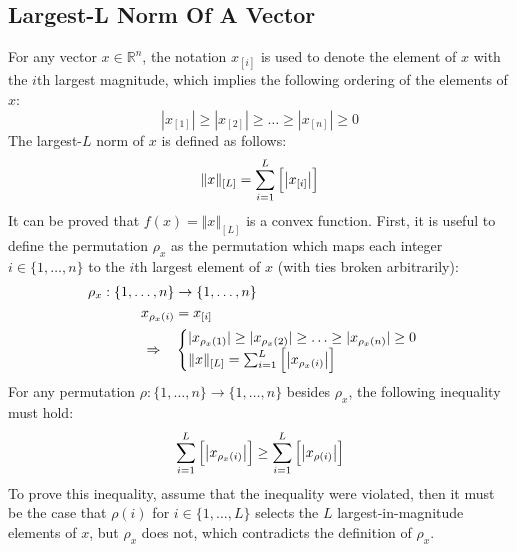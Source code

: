 \subsection{Largest-L Norm Of A Vector}
For any vector $x\in\mathbb{R}^n$, the notation $x_{[i]}$ is used to denote the element of $x$ with the $i$th largest magnitude, which implies the following ordering of the elements of $x$:
\begin{equation*}
    |x_{[1]}| \ge |x_{[2]}| \ge \hdots \ge |x_{[n]}| \ge 0
\end{equation*}
The largest-$L$ norm of $x$ is defined as follows:
\begin{equation}
    \Vert x \Vert_{[L]} = \sum_{i=1}^L{\Bigl[ \left\vert x_{[i]} \right\vert \Bigr]}
\end{equation}
It can be proved that $f(x) = \Vert x \Vert_{[L]}$ is a convex function. First, it is useful to define the permutation $\rho_x$ as the permutation which maps each integer $i\in\{1,\hdots,n\}$ to the $i$th largest element of $x$ (with ties broken arbitrarily):
\begin{align*}
    \rho_x: \{1,\hdots,n\} &\rightarrow \{1,\hdots,n\} \\
    x_{\rho_x(i)} &= x_{[i]} \\
    \Rightarrow \quad &\begin{cases}
        |x_{\rho_x(1)}| \ge |x_{\rho_x(2)}| \ge \hdots \ge |x_{\rho_x(n)}| \ge 0 \\
        \Vert x \Vert_{[L]} = \sum_{i=1}^L{\Bigl[ \left\vert x_{\rho_x(i)} \right\vert \Bigr]}
    \end{cases}
\end{align*}
For any permutation $\rho: \{1,\hdots,n\} \rightarrow \{1,\hdots,n\}$ besides $\rho_x$, the following inequality must hold:
\begin{equation*}
    \sum_{i=1}^L{\Bigl[ \left\vert x_{\rho_x(i)} \right\vert \Bigr]} \ge \sum_{i=1}^L{\Bigl[ \left\vert x_{\rho(i)} \right\vert \Bigr]}
\end{equation*}
To prove this inequality, assume that the inequality were violated, then it must be the case that $\rho(i)$ for $i\in\{1,\hdots,L\}$ selects the $L$ largest-in-magnitude elements of $x$, but $\rho_x$ does not, which contradicts the definition of $\rho_x$.

